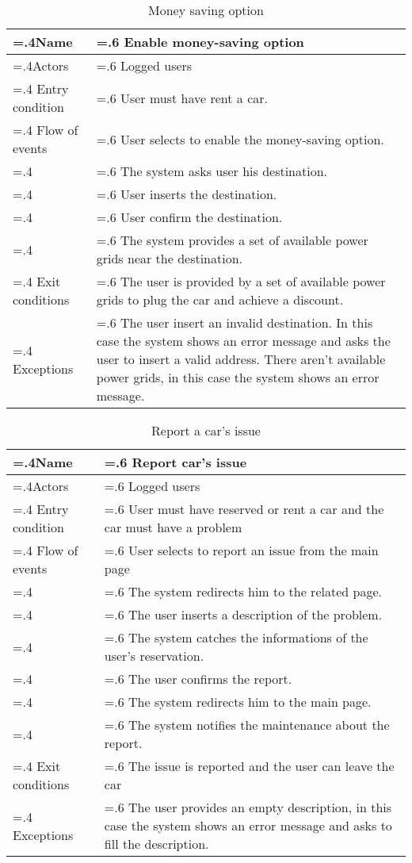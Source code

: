 \documentclass[10pt, a4paper,titlepage]{article}
\begin{document}
\begin{table}[h]
\caption{Money saving option} \label{tab:scenario8}
\begin{tabularx}{\textwidth}{|>{\hsize=.4\hsize}X|>{\hsize=.6\hsize}X|}
\hline
Name & Enable money-saving option \\
\hline
Actors & Logged users \\
\hline
Entry condition & User must have rent a car.\\
\hline
Flow of events & User selects to enable the money-saving option.\\
& The system asks user his destination.\\
& User inserts the destination.\\
& User confirm the destination.\\
& The system provides a set of available power grids near the destination.\\
\hline
Exit conditions & The user is provided by a set of available power grids to plug the car and achieve a discount.\\
\hline
Exceptions & The user insert an invalid destination. In this case the system shows an error message and asks the user to insert a valid address. There aren’t available power grids, in this case the system shows an error message.\\
\hline
\end{tabularx}
\end{table}
\begin{table}[h]
\caption{Report a car's issue} \label{tab:scenario9}
\begin{tabularx}{\textwidth}{|>{\hsize=.4\hsize}X|>{\hsize=.6\hsize}X|}
\hline
Name & Report car’s issue\\
\hline
Actors & Logged users\\ 
\hline
Entry condition & User must have reserved or rent a car and the car must have a problem\\
\hline
Flow of events & User selects to report an issue from the main page\\
& The system redirects him to the related page.\\
& The user inserts a description of the problem.\\
& The system catches the informations of the user’s reservation.\\
& The user confirms the report.\\
& The system redirects him to the main page.\\
& The system notifies the maintenance about the report.\\
\hline
Exit conditions & The issue is reported and the user can leave the car \\
\hline
Exceptions & The user provides an empty description, in this case the system shows an error message and asks to fill the description.\\
\hline
\end{tabularx}
\end{table}
\end{document}
